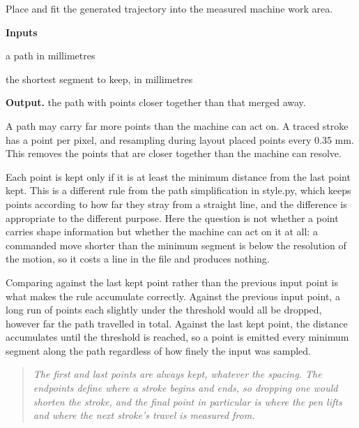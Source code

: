 Place and fit the generated trajectory into the measured machine work area.




\noindent\textbf{Inputs}
\begin{description}[leftmargin=2.2em,style=nextline,font=\normalfont\ttfamily]\setlength\itemsep{1pt}
  \item[{poly}] \normalfont a path in millimetres
  \item[{minSeg}] \normalfont the shortest segment to keep, in millimetres
\end{description}

\noindent\textbf{Output.} the path with points closer together than that merged away.


A path may carry far more points than the machine can act on. A traced stroke has a point per pixel, and resampling during layout placed points every 0.35 mm. This removes the points that are closer together than the machine can resolve.


Each point is kept only if it is at least the minimum distance from the last point kept. This is a different rule from the path simplification in style.py, which keeps points according to how far they stray from a straight line, and the difference is appropriate to the different purpose. Here the question is not whether a point carries shape information but whether the machine can act on it at all: a commanded move shorter than the minimum segment is below the resolution of the motion, so it costs a line in the file and produces nothing.


Comparing against the last kept point rather than the previous input point is what makes the rule accumulate correctly. Against the previous input point, a long run of points each slightly under the threshold would all be dropped, however far the path travelled in total. Against the last kept point, the distance accumulates until the threshold is reached, so a point is emitted every minimum segment along the path regardless of how finely the input was sampled.


\begin{quote}\small\itshape The first and last points are always kept, whatever the spacing. The endpoints define where a stroke begins and ends, so dropping one would shorten the stroke, and the final point in particular is where the pen lifts and where the next stroke's travel is measured from.\end{quote}


